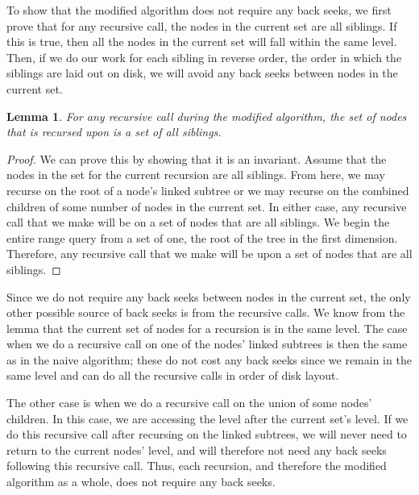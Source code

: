 \documentclass[11pt, oneside]{article}
\newtheorem*{lemma}{Lemma}
\begin{document}
To show that the modified algorithm does not require any back seeks, we first
prove that for any recursive call, the nodes in the current set are all
siblings. If this is true, then all the nodes in the current set will fall
within the same level.  Then, if we do our work for each sibling in reverse
order, the order in which the siblings are laid out on disk, we will avoid any
back seeks between nodes in the current set.

\begin{lemma}
    For any recursive call during the modified algorithm, the set of nodes that
    is recursed upon is a set of all siblings.
\end{lemma}
\begin{proof}
    We can prove this by showing that it is an invariant. Assume that the nodes
    in the set for the current recursion are all siblings. From here, we may
    recurse on the root of a node's linked subtree or we may recurse on the
    combined children of some number of nodes in the current set. In either
    case, any recursive call that we make will be on a set of nodes that are
    all siblings. We begin the entire range query from a set of one, the root
    of the tree in the first dimension. Therefore, any recursive call that we
    make will be upon a set of nodes that are all siblings. 
\end{proof}

Since we do not require any back seeks between nodes in the current set, the
only other possible source of back seeks is from the recursive calls. We know
from the lemma that the current set of nodes for a recursion is in the same
level. The case when we do a recursive call on one of the nodes' linked
subtrees is then the same as in the naive algorithm; these do not cost any back
seeks since we remain in the same level and can do all the recursive calls in
order of disk layout. 

The other case is when we do a recursive call on the union of some nodes'
children. In this case, we are accessing the level after the current set's
level. If we do this recursive call after recursing on the linked subtrees, we
will never need to return to the current nodes' level, and will therefore not
need any back seeks following this recursive call. Thus, each recursion, and
therefore the modified algorithm as a whole, does not require any back seeks.
\end{document}
